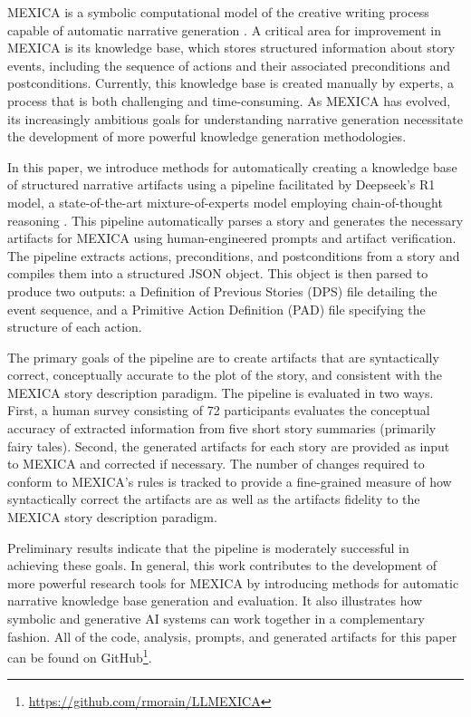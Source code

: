 \documentclass[phd,electronic,oneside,twosidetoc,letterpaper,chaptercenter,parttop,lof]{byumsphd}
\begin{document}
MEXICA is a symbolic computational model of the creative writing process capable of automatic narrative generation \cite{perez1999mexica,perez2001mexica}. A critical area for improvement in MEXICA is its knowledge base, which stores structured information about story events, including the sequence of actions and their associated preconditions and postconditions. Currently, this knowledge base is created manually by experts, a process that is both challenging and time-consuming. As MEXICA has evolved, its increasingly ambitious goals for understanding narrative generation necessitate the development of more powerful knowledge generation methodologies.

In this paper, we introduce methods for automatically creating a knowledge base of structured narrative artifacts \cite{VallsVargas2017TowardsAE,chambers-jurafsky-2008-unsupervised} using a pipeline facilitated by Deepseek's R1 model, a state-of-the-art mixture-of-experts model employing chain-of-thought reasoning \cite{deepseek2025r1}. This pipeline automatically parses a story and generates the necessary artifacts for MEXICA using human-engineered prompts and artifact verification. The pipeline extracts actions, preconditions, and postconditions from a story and compiles them into a structured JSON object. This object is then parsed to produce two outputs: a Definition of Previous Stories (DPS) file detailing the event sequence, and a Primitive Action Definition (PAD) file specifying the structure of each action.

The primary goals of the pipeline are to create artifacts that are syntactically correct, conceptually accurate to the plot of the story, and consistent with the MEXICA story description paradigm. The pipeline is evaluated in two ways. First, a human survey consisting of 72 participants evaluates the conceptual accuracy of extracted information from five short story summaries (primarily fairy tales). Second, the generated artifacts for each story are provided as input to MEXICA and corrected if necessary. The number of changes required to conform to MEXICA's rules is tracked to provide a fine-grained measure of how syntactically correct the artifacts are as well as the artifacts fidelity to the MEXICA story description paradigm. 

Preliminary results indicate that the pipeline is moderately successful in achieving these goals. In general, this work contributes to the development of more powerful research tools for MEXICA by introducing methods for automatic narrative knowledge base generation and evaluation. It also illustrates how symbolic and generative AI systems can work together in a complementary fashion.  All of the code, analysis, prompts, and generated artifacts for this paper can be found on GitHub\footnote{\url{https://github.com/rmorain/LLMEXICA}}.
\end{document}
